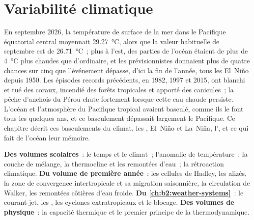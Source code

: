 \chapter{Variabilité climatique}\label{ch:b2:climate-variability}

En septembre 2026, la température de surface de la mer dans le Pacifique équatorial central
moyennait \qty{29.27}{\celsius}, alors que la valeur habituelle de septembre est de \qty{26.71}{\celsius}~; plus à l'est, des
parties de l'océan étaient de plus de \qty{4}{\celsius} plus chaudes que d'ordinaire, et les prévisionnistes donnaient
plus de quatre chances sur cinq que l'événement dépasse, d'ici la fin de l'année,
tous les El~Niño depuis 1950. Les épisodes records précédents, en 1982, 1997 et 2015,
ont blanchi et tué des coraux, incendié des forêts tropicales et apporté des canicules~;
la pêche d'anchois du Pérou chute fortement lorsque cette eau chaude persiste. L'océan et
l'atmosphère du Pacifique tropical avaient basculé, comme ils le font tous les quelques ans,
et ce basculement dépassait largement le Pacifique. Ce chapitre décrit ces basculements du climat,
les , El~Niño et La~Niña, l', et ce qui fait de l'océan leur mémoire.

\begin{recall}
\textbf{Des volumes scolaires}~: le temps et le climat~; l'anomalie de température~; la couche de mélange,
la thermocline et les remontées d'eau~; la rétroaction climatique. \textbf{Du volume de première année}~: les
cellules de Hadley, les alizés, la zone de convergence intertropicale et sa migration saisonnière,
la circulation de Walker, les remontées côtières d'eau froide. \textbf{Du \cref{ch:b2:weather-systems}}~: le
courant-jet, les , les cyclones extratropicaux et le blocage. \textbf{Des volumes de physique}~:
la capacité thermique et le premier principe de la thermodynamique.
\end{recall}

